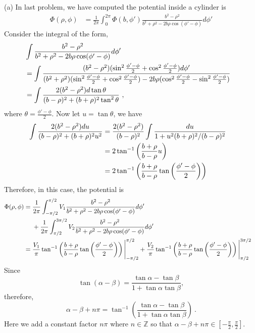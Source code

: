 \documentclass[12pt]{article}
\begin{document}
\newpage
{} (a) In last problem, we have computed the potential inside a cylinder is
\begin{align}
    \Phi(\rho, \phi) &= \frac{1}{2\pi} \int_0^{2\pi} \Phi(b, \phi') \frac{b^2 - \rho^2}{b^2 + \rho^2 - 2b\rho \cos(\phi' - \phi)} d\phi'
\end{align}
Consider the integral of the form,
\begin{align}
    &\int \frac{b^2 - \rho^2}{b^2 + \rho^2 - 2b\rho \cos(\phi' - \phi)} d\phi'\cr
    &= \int \frac{(b^2 - \rho^2) (\sin^2 \frac{\phi'-\phi}{2}+ \cos^2 \frac{\phi'-\phi}{2}) d\phi'}{(b^2 + \rho^2)(\sin^2 \frac{\phi'-\phi}{2}+ \cos^2 \frac{\phi'-\phi}{2})-2b\rho( \cos^2 \frac{\phi'-\phi}{2} - \sin^2 \frac{\phi'-\phi}{2})}\cr
    &= \int \frac{2(b^2 - \rho^2) d \tan \theta}{(b-\rho)^2 + (b+ \rho)^2 \tan^2\theta}~,
\end{align}
where $\theta = \frac{\phi'-\phi}{2}$. Now let $u = \tan \theta$, we have
\begin{align}
    \int \frac{2(b^2 - \rho^2) d u}{(b-\rho)^2 + (b+ \rho)^2 u^2} &= \frac{2(b^2 - \rho^2)}{(b-\rho)^2} \int \frac{du}{1 + u^2(b+\rho)^2/{(b-\rho)^2}}\cr
    &= 2 \tan^{-1}\left(\frac{b + \rho}{b-\rho} u\right) \cr
    &= 2 \tan^{-1} \left(\frac{b + \rho}{b - \rho} \tan\left(\frac{\phi'-\phi}{2}\right) \right)
\end{align}
Therefore, in this case, the potential is
\begin{align}
    \Phi(\rho, \phi) &= \frac{1}{2\pi} \int_{-\pi/2}^{\pi/2} V_1 \frac{b^2 - \rho^2}{b^2 + \rho^2 - 2b\rho \cos(\phi' - \phi)} d\phi'\cr
    &~~~~+ \frac{1}{2\pi} \int_{\pi/2}^{3\pi/2} V_2 \frac{b^2 - \rho^2}{b^2 + \rho^2 - 2b\rho \cos(\phi' - \phi)} d\phi'\cr
    &= \frac{V_1}{\pi} \tan^{-1}\left(\frac{b+\rho}{b- \rho} \tan\left(\frac{\phi'-\phi}{2}\right)\right)\Bigg|_{-\pi/2}^{\pi/2} + \frac{V_2}{\pi} \tan^{-1}\left(\frac{b+\rho}{b- \rho} \tan\left(\frac{\phi'-\phi}{2}\right)\right)\Bigg|_{\pi/2}^{3\pi/2} \nonumber
\end{align}
Since
\begin{equation}
    \tan(\alpha - \beta) = \frac{\tan\alpha - \tan \beta}{1 + \tan \alpha \tan \beta},
\end{equation}
therefore,
\begin{equation}
    \alpha - \beta + n \pi = \tan^{-1}\left(\frac{\tan \alpha - \tan \beta}{1 + \tan \alpha \tan \beta}\right)~.
\end{equation}
Here we add a constant factor $n\pi$ where $n \in \mathbb Z$ so that $\alpha - \beta + n\pi \in [-\frac \pi 2, \frac \pi 2]$.
\end{document}
